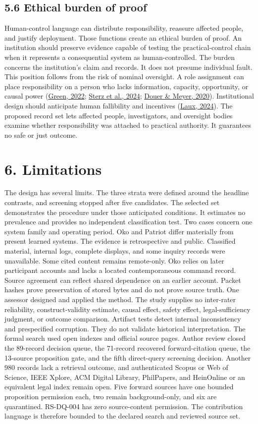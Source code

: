 \documentclass[11pt]{article}
\begin{document}
\subsection*{5.6 Ethical burden of proof}
Human-control language can distribute responsibility, reassure affected people, and justify deployment. Those functions create an ethical burden of proof. An institution should preserve evidence capable of testing the practical-control chain when it represents a consequential system as human-controlled. The burden concerns the institution's claim and records. It does not presume individual fault.
This position follows from the risk of nominal oversight. A role assignment can place responsibility on a person who lacks information, capacity, opportunity, or causal power (\href{https://doi.org/10.1016/j.clsr.2022.105681}{Green, 2022}; \href{https://doi.org/10.1145/3630106.3659051}{Sterz et al., 2024}; \href{https://doi.org/10.1109/TASE.2020.2965466}{Douer \& Meyer, 2020}). Institutional design should anticipate human fallibility and incentives (\href{https://doi.org/10.1007/s00146-023-01777-z}{Laux, 2024}). The proposed record set lets affected people, investigators, and oversight bodies examine whether responsibility was attached to practical authority. It guarantees no safe or just outcome.
\FloatBarrier
\section*{6. Limitations}
The design has several limits. The three strata were defined around the headline contrasts, and screening stopped after five candidates. The selected set demonstrates the procedure under those anticipated conditions. It estimates no prevalence and provides no independent classification test. Two cases concern one system family and operating period. Oko and Patriot differ materially from present learned systems.
The evidence is retrospective and public. Classified material, internal logs, complete displays, and some inquiry records were unavailable. Some cited content remains remote-only. Oko relies on later participant accounts and lacks a located contemporaneous command record. Source agreement can reflect shared dependence on an earlier account. Packet hashes prove preservation of stored bytes and do not prove source truth.
One assessor designed and applied the method. The study supplies no inter-rater reliability, construct-validity estimate, causal effect, safety effect, legal-sufficiency judgment, or outcome comparison. Artifact tests detect internal inconsistency and prespecified corruption. They do not validate historical interpretation.
The formal search used open indexes and official source pages. Author review closed the 89-record decision queue, the 71-record recovered forward-citation queue, the 13-source proposition gate, and the fifth direct-query screening decision. Another 980 records lack a retrieval outcome, and authenticated Scopus or Web of Science, IEEE Xplore, ACM Digital Library, PhilPapers, and HeinOnline or an equivalent legal index remain open. Five forward sources have one bounded proposition permission each, two remain background-only, and six are quarantined. RS-DQ-004 has zero source-content permission. The contribution language is therefore bounded to the declared search and reviewed source set.
\FloatBarrier
\end{document}
